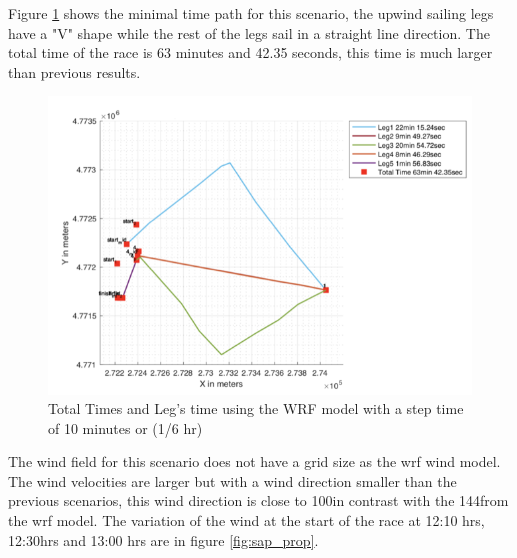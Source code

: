 Figure \ref{fig:times_winSAP} shows the minimal time path for this scenario, the upwind sailing legs have a "V" shape while the rest of the legs sail in a straight line direction. The total time of the race is 63 minutes and 42.35 seconds, this time is much larger than previous results. \par  

\begin{figure} [hbt!]
    \centering
    \includegraphics[width=0.75 \linewidth]{images/WindSap_mtp1_angConst.png}
    \caption{Total Times and Leg's time using the WRF model with a step time of 10 minutes or (1/6 hr)}
    \label{fig:times_winSAP}
\end{figure}

The wind field for this scenario does not have a grid size as the \acrshort{wrf} wind model. The wind velocities are larger but with a wind direction smaller than the previous scenarios, this wind direction is close to 100\degree in contrast with the 144\degree from the \acrshort{wrf} model.  The variation of the wind at the start of the race at 12:10 hrs, 12:30hrs and 13:00 hrs are in figure \ref{fig:sap_prop}. \par 

